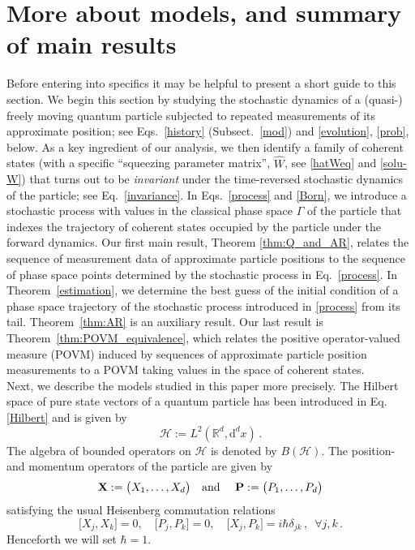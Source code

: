 \documentclass[12pt]{article}
\renewcommand{\d}{{\mathrm d}}
\begin{document}
\section{More about models, and summary of main results}\label{models}
Before entering into specifics it may be helpful to present a short guide to this section.
We begin this section by studying the stochastic dynamics of a (quasi-) freely 
moving quantum particle subjected to repeated measurements of its approximate position; see Eqs.~\eqref{history} 
(Subsect.~\ref{mod}) and \eqref{evolution}, \eqref{prob}, below. As a key ingredient of our analysis, we then
identify a family of coherent states (with a specific ``squeezing parameter matrix'', $\widehat{W}$, see \eqref{hatWeq} 
and \eqref{solu-W}) 
that turns out to be \textit{invariant} under the time-reversed stochastic dynamics of the particle; see Eq.~\eqref{invariance}. In 
Eqs.~\eqref{process} and \eqref{Born}, we introduce a stochastic process with values in the classical phase 
space $\Gamma$ of the particle that indexes the trajectory of coherent states occupied by the particle under the 
forward dynamics. Our first main result, Theorem \ref{thm:Q_and_AR}, 
relates the sequence of measurement data of approximate particle positions to the sequence of 
phase space points determined by the 
stochastic process in Eq.~\eqref{process}. In Theorem~\ref{estimation}, we determine the best guess of the initial 
condition of a phase space trajectory of the stochastic process introduced in \eqref{process} from its tail. 
Theorem~\ref{thm:AR} is an auxiliary result. Our last result is Theorem~\ref{thm:POVM_equivalence}, which 
relates the  positive operator-valued measure (POVM) induced by sequences of approximate particle position 
measurements to a POVM taking values in the 
space of coherent states. \\

Next, we describe the models studied in this paper more precisely.
The Hilbert space of pure state vectors of a quantum particle 
has been introduced in Eq. \eqref{Hilbert} and is given by
\begin{equation}\label{space}
\mathcal{H}:= L^{2}(\mathbb{R}^{d}, \d^{d}x)\,.
\end{equation}
The algebra of bounded operators on $\mathcal{H}$ is denoted by $B(\mathcal{H})$. The position- and momentum 
operators of the particle  are given by 
\begin{equation}\label{X-P}
{\bf{X}}:= \big(X_1, \dots, X_{d} \big) \quad \text{and } \quad {\bf{P}}:= \big( P_1,\dots, P_{d} \big)
\end{equation}
satisfying the usual Heisenberg commutation relations
\begin{equation}\label{CR}
\big[X_j, X_k \big]=0, \quad \big[P_j, P_k \big]=0, \quad  \big[X_j, P_k \big] = i \hbar \delta_{jk}\,,\,\,\,\forall j, k\,.
\end{equation}
Henceforth we will set $\hbar=1$. 
\end{document}
